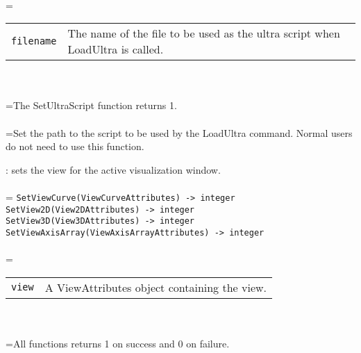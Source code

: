 \documentclass[10pt,a4paper]{report}
\begin{document}
 \\ 
\hangindent=\parindent 
\begin{tabular}{lp{9cm}}
\verb!filename! & The name of the file to be used as the ultra script when LoadUltra is called. \\
\end{tabular} \\[-2mm]


 \\ 
\hangindent=\parindent The SetUltraScript function returns 1. \\[-3mm] 

 \\ 
\hangindent=\parindent Set the path to the script to be used by the LoadUltra command. Normal users do not need to use this function. \\[-3mm] 

\newpage


{}
: sets the view for the active visualization window.\\[-3mm]

 \\ 
\hangindent=\parindent 
\verb!SetViewCurve(ViewCurveAttributes) -> integer!\\ 
\verb!SetView2D(View2DAttributes) -> integer!\\ 
\verb!SetView3D(View3DAttributes) -> integer!\\ 
\verb!SetViewAxisArray(ViewAxisArrayAttributes) -> integer!\\ [-3mm]

 \\ 
\hangindent=\parindent 
\begin{tabular}{lp{9cm}}
\verb!view! & A ViewAttributes object containing the view. \\
\end{tabular} \\[-2mm]


 \\ 
\hangindent=\parindent All functions returns 1 on success and 0 on failure. \\[-3mm] 
\end{document}
